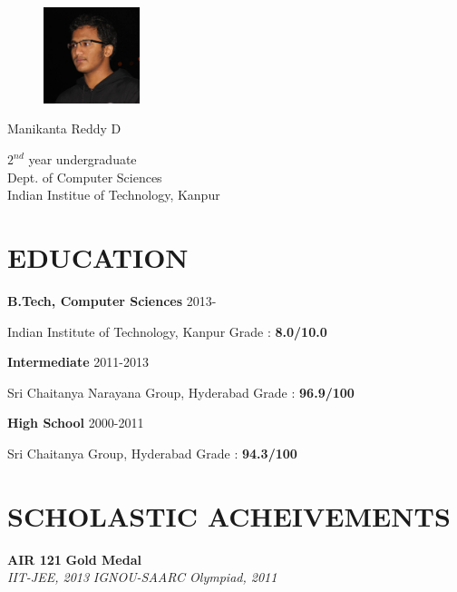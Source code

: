 \documentclass{article}
\newcommand{\sepspace}{\vspace*{0.8em}}
\newcommand{\MyName}[1]{
		\huge \usefont{OT1}{phv}{b}{n} \hfill #1 		
		\par \normalsize \normalfont
		}
\newcommand{\NewPart}[1]{\section*{\uppercase{#1}}}
\newcommand{\EducationEntry}[4]{
		\noindent \textbf{#1} \hfill 	{#2} \par				
		\noindent #3 \hfill	
		Grade : \textbf{#4} 	
		}
\newcommand{\ScholasticAcheivements}[4]{
		\noindent \textbf{#1} \hfill \textbf{#2} \\
		\textit{#3}	 \hfill	 \textit{ #4} 	
		\normalsize \par
		}
\begin{document}
\begin{figure}
	\vspace*{-3em}
		\includegraphics[width=0.25\textwidth]{photo.jpg}
\end{figure}

\MyName{Manikanta Reddy D}
\begin{flushright}
	$2^{nd}$ year undergraduate\\
	Dept. of Computer Sciences\\
	Indian Institue of Technology, Kanpur
\end{flushright}

\sepspace

\NewPart{Education}{}

\EducationEntry{B.Tech, Computer Sciences}{2013-}{Indian Institute of Technology, Kanpur}{8.0/10.0}

\sepspace

\EducationEntry{Intermediate}{2011-2013}{Sri Chaitanya Narayana Group, Hyderabad}{96.9/100}

\sepspace

\EducationEntry{High School}{2000-2011}{Sri Chaitanya Group, Hyderabad}{94.3/100}


\NewPart{Scholastic Acheivements}{}

\ScholasticAcheivements{AIR 121}{Gold Medal}{IIT-JEE, 2013}{IGNOU-SAARC Olympiad, 2011}

\sepspace
\end{document}
